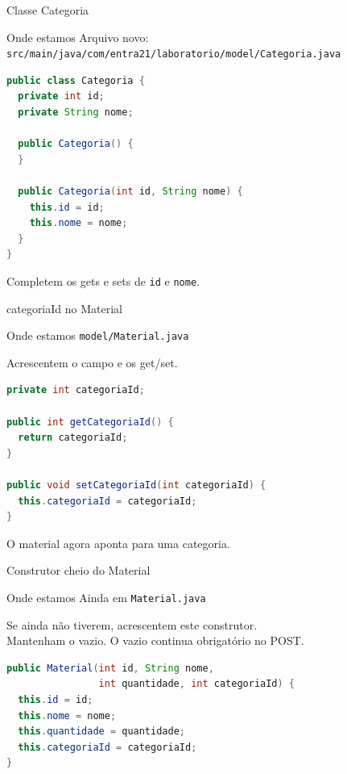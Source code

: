 \documentclass[aspectratio=169,11pt]{beamer}
\newcommand{\onde}[1]{%
  \begin{block}{Onde estamos}
    #1
  \end{block}
}
\begin{document}
\begin{frame}[fragile]{Classe Categoria}
  \onde{Arquivo novo:\\
        \texttt{src/main/java/com/entra21/laboratorio/model/Categoria.java}}

\begin{lstlisting}[language=Java,basicstyle=\ttfamily\footnotesize]
public class Categoria {
  private int id;
  private String nome;

  public Categoria() {
  }

  public Categoria(int id, String nome) {
    this.id = id;
    this.nome = nome;
  }
}
\end{lstlisting}

  Completem os gets e sets de \texttt{id} e \texttt{nome}.
\end{frame}

\begin{frame}[fragile]{categoriaId no Material}
  \onde{\texttt{model/Material.java}}

  Acrescentem o campo e os get/set.

\begin{lstlisting}[language=Java,basicstyle=\ttfamily\footnotesize]
private int categoriaId;

public int getCategoriaId() {
  return categoriaId;
}

public void setCategoriaId(int categoriaId) {
  this.categoriaId = categoriaId;
}
\end{lstlisting}

  O material agora aponta para uma categoria.
\end{frame}

\begin{frame}[fragile]{Construtor cheio do Material}
  \onde{Ainda em \texttt{Material.java}}

  Se ainda não tiverem, acrescentem este construtor.\\
  Mantenham o vazio. O vazio continua obrigatório no POST.

\begin{lstlisting}[language=Java,basicstyle=\ttfamily\footnotesize]
public Material(int id, String nome,
                int quantidade, int categoriaId) {
  this.id = id;
  this.nome = nome;
  this.quantidade = quantidade;
  this.categoriaId = categoriaId;
}
\end{lstlisting}
\end{frame}
\end{document}
